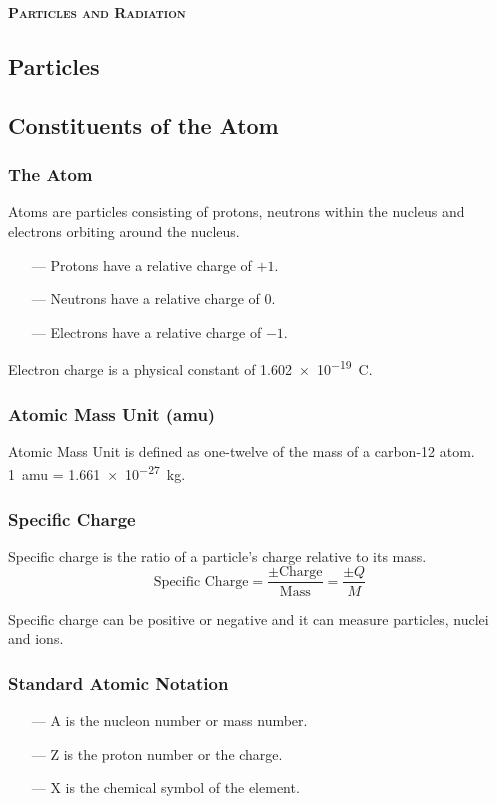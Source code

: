 \documentclass[10pt]{article}
\begin{document}
\LARGE \textbf{{\textsc{Particles and Radiation}}} \hrulefill
\begin{multicols*}{2}
	\normalsize
	\section{Particles}
	\subsection{Constituents of the Atom}

	\subsubsection{The Atom}
	\begin{center}
	\end{center}
	Atoms are particles consisting of protons, neutrons within the nucleus and
	electrons orbiting around the nucleus.
	\medskip
	\begin{itemize}
		\item[---] Protons have a relative charge of $+1$.
		\item[---] Neutrons have a relative charge of $0$.
		\item[---] Electrons have a relative charge of $-1$.
	\end{itemize}
	\medskip
	Electron charge is a physical constant of \qty{1.602e-19}{\coulomb}.

	\subsubsection{Atomic Mass Unit (amu)}
	Atomic Mass Unit is defined as one-twelve of the mass of a
	carbon-12 atom. \qty{1}{amu} = \qty{1.661e-27}{\kilo\gram}.

	\subsubsection{Specific Charge}
	Specific charge is the ratio of a particle's charge relative to its mass.
	\begin{equation}
		\text{Specific Charge} = \dfrac{\pm \text{Charge}}{\text{Mass}} = \dfrac{\pm Q}{M}
	\end{equation}

	Specific charge can be positive or negative and it can measure particles, nuclei
	and ions.

	\subsubsection{Standard Atomic Notation}
	\begin{center}
	\end{center}
	\begin{itemize}
		\item[---] A is the nucleon number or mass number.
		\item[---] Z is the proton number or the charge.
		\item[---] X is the chemical symbol of the element.
	\end{itemize}


\end{multicols*}
\end{document}
